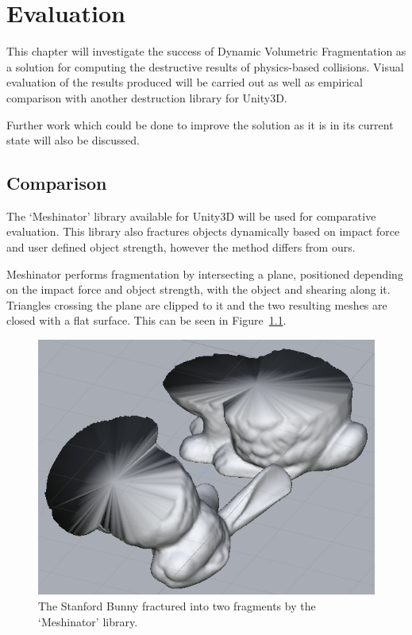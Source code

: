 \chapter{Evaluation}

This chapter will investigate the success of Dynamic Volumetric Fragmentation as a solution for computing the destructive results of physics-based collisions. Visual evaluation of the results produced will be carried out as well as empirical comparison with another destruction library for Unity3D.

Further work which could be done to improve the solution as it is in its current state will also be discussed.

\section{Comparison}

The `Meshinator' library available for Unity3D will be used for comparative evaluation\cite{Meshinator}. This library also fractures objects dynamically based on impact force and user defined object strength, however the method differs from ours.

Meshinator performs fragmentation by intersecting a plane, positioned depending on the impact force and object strength, with the object and shearing along it. Triangles crossing the plane are clipped to it and the two resulting meshes are closed with a flat surface. This can be seen in Figure~\ref{fig:4.1}.

\begin{figure}
\centerline{\includegraphics[scale=0.75]{fracture_bunny.png}}
\caption{The Stanford Bunny fractured into two fragments by the `Meshinator' library.}
\label{fig:4.1}
\end{figure}

